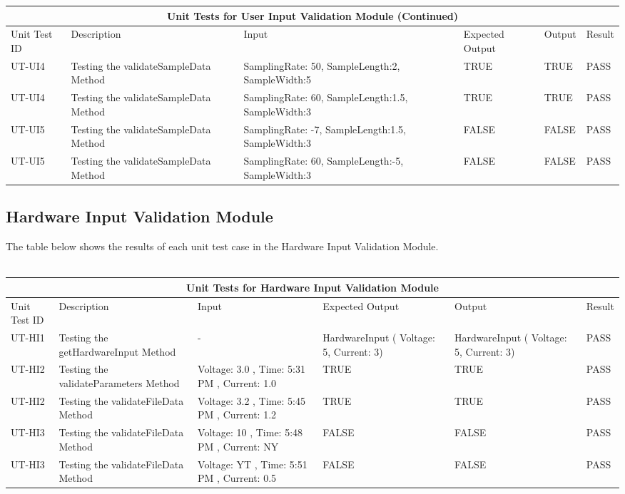 \documentclass[12pt, titlepage]{article}
\begin{document}
 \pagebreak 

 \begin{tabular}{ |p{1.5cm}||p{2cm}|p{2.5cm}|p{2cm}|p{2cm}|p{1.5cm}|}
  \hline
  \multicolumn{6}{|c|}{Unit Tests for User Input Validation Module (Continued)} \\
  \hline
  Unit Test ID & Description & Input & Expected Output & Output & Result\\
  \hline
  UT-UI4   & Testing the validateSampleData Method  &  SamplingRate: 50, SampleLength:2, SampleWidth:5 & TRUE & TRUE & PASS \\
  \hline
  UT-UI4   & Testing the validateSampleData Method  &  SamplingRate: 60, SampleLength:1.5, SampleWidth:3 & TRUE & TRUE & PASS \\
  \hline
  UT-UI5   & Testing the validateSampleData Method  &  SamplingRate: -7, SampleLength:1.5, SampleWidth:3 & FALSE & FALSE & PASS \\
  \hline
  UT-UI5  & Testing the validateSampleData Method  &  SamplingRate: 60, SampleLength:-5, SampleWidth:3 & FALSE & FALSE & PASS \\
  \hline
 \end{tabular}

 \pagebreak
 \subsection{Hardware Input Validation Module}
 The table below shows the results of each unit test case in the Hardware Input Validation Module.\\
 \\
 \begin{tabular}{ |p{1.5cm}||p{2cm}|p{2cm}|p{3cm}|p{3cm}|p{1.5cm}|}
  \hline
  \multicolumn{6}{|c|}{Unit Tests for Hardware Input Validation Module} \\
  \hline
  Unit Test ID & Description & Input & Expected Output & Output & Result\\
  \hline
  UT-HI1   & Testing the getHardwareInput Method  &  -  & HardwareInput ( Voltage: 5, Current: 3) & HardwareInput ( Voltage: 5, Current: 3) & PASS \\
  \hline
  UT-HI2   & Testing the validateParameters Method  &  Voltage: 3.0 , Time: 5:31 PM , Current: 1.0 & TRUE & TRUE & PASS \\
  \hline
  UT-HI2   & Testing the validateFileData Method  &  Voltage: 3.2 , Time: 5:45 PM , Current: 1.2 & TRUE & TRUE & PASS \\
  \hline
  UT-HI3   & Testing the validateFileData Method  &  Voltage: 10 , Time: 5:48 PM , Current: NY & FALSE & FALSE & PASS \\
  \hline
  UT-HI3   & Testing the validateFileData Method  &  Voltage: YT , Time: 5:51 PM , Current: 0.5  & FALSE & FALSE & PASS \\
  \hline
 \end{tabular}
\end{document}

